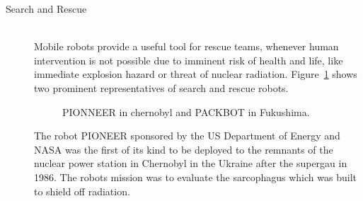 \begin{description}
\item[Search and Rescue]\hfill \\
Mobile robots provide a useful tool for rescue teams, whenever human intervention is not possible due to imminent risk of health and life, like immediate explosion hazard or threat of nuclear radiation.  
Figure~\ref{fig:fig_rescue} shows two prominent representatives of search and rescue robots.
\begin{figure}[thpb]
	  \myfloatalign
      \footnotesize
      \centering
   \caption[Rescue robots]{PIONNEER in chernobyl and PACKBOT in Fukushima.}
   \label{fig:fig_rescue}
\end{figure}

The robot PIONEER sponsored by the US Department of Energy and NASA was the first of its kind to be deployed to the remnants of the nuclear power station in Chernobyl in the Ukraine after the supergau in 1986. 
The robots mission was to evaluate the sarcophagus which was built to shield off radiation.


\end{description}
